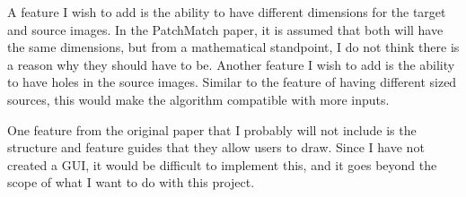 A feature I wish to add is the ability to have different dimensions for the target and source images. In the PatchMatch paper, it is assumed that both will have the same dimensions, but from a mathematical standpoint, I do not think there is a reason why they should have to be. Another feature I wish to add is the ability to have holes in the source images. Similar to the feature of having different sized sources, this would make the algorithm compatible with more inputs.

One feature from the original paper that I probably will not include is the structure and feature guides that they allow users to draw. Since I have not created a GUI, it would be difficult to implement this, and it goes beyond the scope of what I want to do with this project.